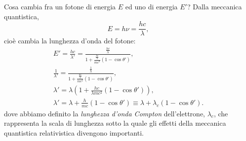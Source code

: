 \begin{Answer}
Cosa cambia fra un fotone di energia $E$ ed uno di energia $E'$? Dalla meccanica quantistica,
\begin{equation*}
    E = h\nu = \frac{hc}{\lambda},
\end{equation*}
cioè cambia la lunghezza d'onda del fotone:
\begin{align*}
    E' = \frac{hc}{\lambda'} = \frac{\frac{hc}{\lambda}}{1+\frac{\frac{hc}{\lambda}}{mc^2}(1-\cos\theta')},\\
    \frac{1}{\lambda'} = \frac{\frac{1}{\lambda}}{1+\frac{\frac{hc}{\lambda}}{mc^2}(1-\cos\theta')},\\
    \lambda' = {\lambda}\left(1+\frac{hc}{\lambda mc^2}(1-\cos\theta')\right),\\
    \lambda' = \lambda + \frac{h}{m c}(1-\cos\theta')\equiv \lambda + \lambda_c(1-\cos\theta').
\end{align*}
dove abbiamo definito la \emph{lunghezza d'onda Compton} dell'elettrone, $\lambda_c$, che rappresenta la scala di lunghezza sotto la quale gli effetti della meccanica quantistica relativistica divengono importanti.
\end{Answer}

